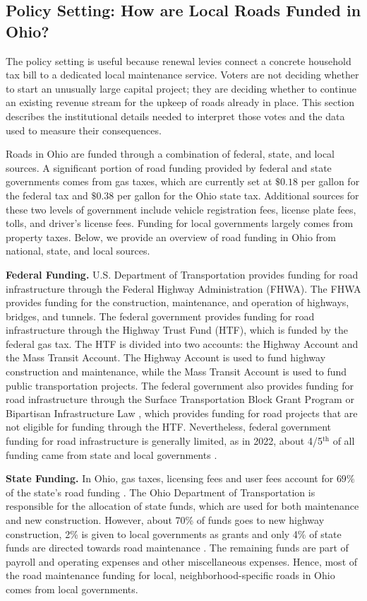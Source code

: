 ﻿\subsection{Policy Setting: How are Local Roads Funded in Ohio?}

The policy setting is useful because renewal levies connect a concrete household tax bill to a dedicated local maintenance service. Voters are not deciding whether to start an unusually large capital project; they are deciding whether to continue an existing revenue stream for the upkeep of roads already in place. This section describes the institutional details needed to interpret those votes and the data used to measure their consequences.

Roads in Ohio are funded through a combination of federal, state, and local sources. A significant portion of road funding provided by federal and state governments comes from gas taxes, which are currently set at $\$0.18$ per gallon for the federal tax and $\$0.38$ per gallon for the Ohio state tax. Additional sources for these two levels of government include vehicle registration fees, license plate fees, tolls, and driver's license fees. Funding for local governments largely comes from property taxes. Below, we provide an overview of road funding in Ohio from national, state, and local sources.

{\bf Federal Funding.} U.S. Department of Transportation provides funding for road infrastructure through the Federal Highway Administration (FHWA). The FHWA provides funding for the construction, maintenance, and operation of highways, bridges, and tunnels. The federal government provides funding for road infrastructure through the Highway Trust Fund (HTF), which is funded by the federal gas tax. The HTF is divided into two accounts: the Highway Account and the Mass Transit Account. The Highway Account is used to fund highway construction and maintenance, while the Mass Transit Account is used to fund public transportation projects. The federal government also provides funding for road infrastructure through the Surface Transportation Block Grant Program or Bipartisan Infrastructure Law \citep{USDOT_BIL_Ohio}, which provides funding for road projects that are not eligible for funding through the HTF. Nevertheless, federal government funding for road infrastructure is generally limited, as in 2022, about 4/5$^\text{th}$ of all funding came from state and local governments \citep{pgpf_htf_explained}.

{\bf State Funding.}
In Ohio, gas taxes, licensing fees and user fees account for $69\%$ of the state's road funding \citep{boesen2021}. The Ohio Department of Transportation is responsible for the allocation of state funds, which are used for both maintenance and new construction. However, about 70\% of funds goes to new highway construction, 2\% is given to local governments as grants and only 4\% of state funds are directed towards road maintenance \citep{odot2023}. The remaining funds are part of payroll and operating expenses and other miscellaneous expenses. Hence, most of the road maintenance funding for local, neighborhood-specific roads in Ohio comes from local governments.

